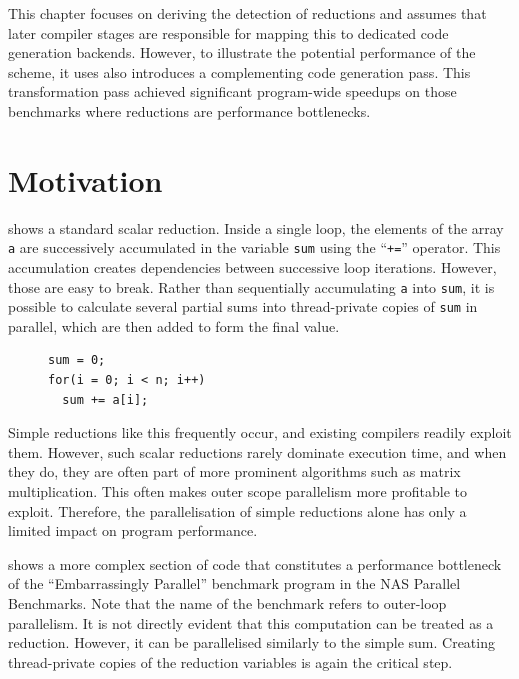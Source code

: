     This chapter focuses on deriving the detection of reductions and assumes
    that later compiler stages are responsible for mapping this to dedicated
    code generation backends.
    However, to illustrate the potential performance of the scheme, it uses
    also introduces a complementing code generation pass.
    This transformation pass achieved significant program-wide speedups on those
    benchmarks where reductions are performance bottlenecks.

\section{Motivation}

     shows a standard scalar reduction.
    Inside a single loop, the elements of the array \texttt{a} are successively
    accumulated in the variable \texttt{sum} using the ``\texttt{+=}'' operator.
    This accumulation creates dependencies between successive loop iterations.
    However, those are easy to break.
    Rather than sequentially accumulating {\tt a} into {\tt sum}, it is possible
    to calculate several partial sums into thread-private copies of
    \texttt{sum} in parallel, which are then added to form the final value.

\begin{figure}[h]
\begin{lstlisting}[language=MyCpp,label={sum-figure},caption=
    {The most conventional example of a reduction is the adding up of values
     in an array:
     The reduction operator ``{\tt+}'' {\it reduces} the array \texttt{a} to a
     single element -- the reduction variable {\tt sum}.}]
sum = 0;
for(i = 0; i < n; i++)
  sum += a[i];
\end{lstlisting}
\end{figure}

    Simple reductions like this frequently occur, and existing compilers readily
    exploit them.
    However, such scalar reductions rarely dominate execution time,
    and when they do, they are often part of more prominent algorithms such as
    matrix multiplication.
    This often makes outer scope parallelism more profitable to exploit.
    Therefore, the parallelisation of simple reductions alone has only a
    limited impact on program performance.

     shows a more complex section of code that
    constitutes a performance bottleneck of the ``Embarrassingly Parallel''
    benchmark program in the NAS Parallel Benchmarks.
    Note that the name of the benchmark refers to outer-loop parallelism.
    It is not directly evident that this computation can be treated as a
    reduction.
    However, it can be parallelised similarly to the simple sum.
    Creating thread-private copies of the reduction variables is again the
    critical step.

